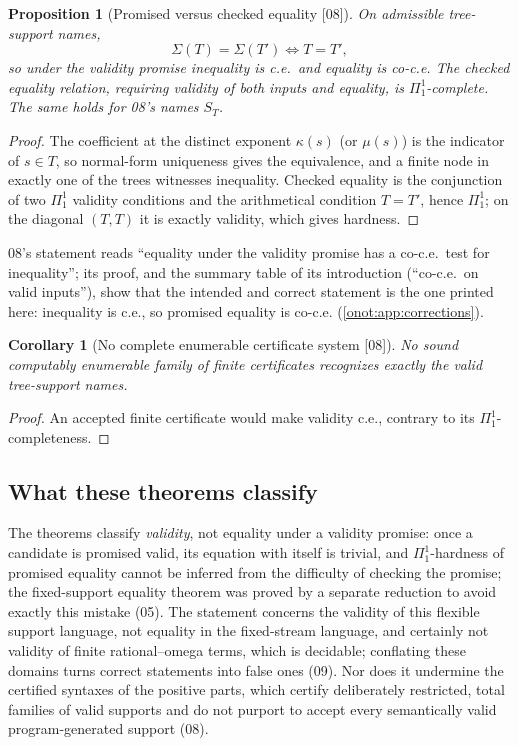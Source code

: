 \documentclass[11pt,oneside]{article}
\numberwithin{equation}{section}
\newtheorem{proposition}[proposition]{Proposition}
\newtheorem{corollary}[corollary]{Corollary}
\theoremstyle{definition}
\theoremstyle{remark}
\newcommand{\src}[1]{\textup{\textsf{\small[#1]}}}
\begin{document}
\begin{proposition}[Promised versus checked equality \src{08}]\label{onot:neg:prop:treeequality}
On admissible tree-support names,
\[
 \Sigma(T)=\Sigma(T')\iff T=T',
\]
so under the validity promise inequality is c.e.\ and equality is co-c.e. The
checked equality relation, requiring validity of both inputs and equality, is
$\Pi^1_1$-complete. The same holds for 08's names $S_T$.
\end{proposition}
\begin{proof}
The coefficient at the distinct exponent $\kappa(s)$ (or $\mu(s)$) is the indicator
of $s\in T$, so normal-form uniqueness gives the equivalence, and a finite node in
exactly one of the trees witnesses inequality. Checked equality is the conjunction
of two $\Pi^1_1$ validity conditions and the arithmetical condition $T=T'$, hence
$\Pi^1_1$; on the diagonal $(T,T)$ it is exactly validity, which gives hardness.
\end{proof}

08's statement reads ``equality under the validity promise has a co-c.e.\ test for
inequality''; its proof, and the summary table of its introduction (``co-c.e.\ on
valid inputs''), show that the intended and correct statement is the one printed
here: inequality is c.e., so promised equality is co-c.e. (\cref{onot:app:corrections}).

\begin{corollary}[No complete enumerable certificate system \src{08}]\label{onot:neg:cor:nocertificates}
No sound computably enumerable family of finite certificates recognizes exactly
the valid tree-support names.
\end{corollary}
\begin{proof}
An accepted finite certificate would make validity c.e., contrary to its
$\Pi^1_1$-completeness.
\end{proof}

\subsection{What these theorems classify}

The theorems classify \emph{validity}, not equality under a validity promise: once a
candidate is promised valid, its equation with itself is trivial, and
$\Pi^1_1$-hardness of promised equality cannot be inferred from the difficulty of
checking the promise; the fixed-support equality theorem was proved by a separate
reduction to avoid exactly this mistake (05). The statement concerns the validity
of this flexible support language, not equality in the fixed-stream language, and
certainly not validity of finite rational--omega terms, which is decidable;
conflating these domains turns correct statements into false ones (09). Nor does it
undermine the certified syntaxes of the positive parts, which certify deliberately
restricted, total families of valid supports and do not purport to accept every
semantically valid program-generated support (08).
\end{document}
